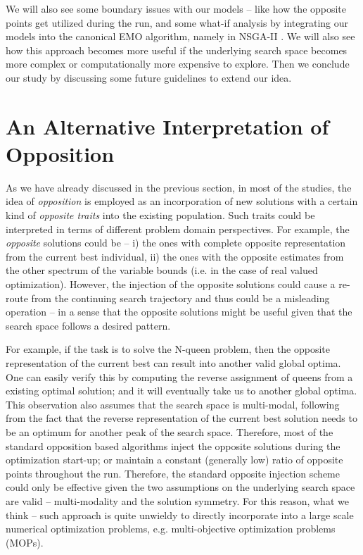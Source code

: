 \documentclass[journal]{IEEEtran}
\begin{document}
We will also see some boundary issues with our models -- like how the opposite points get utilized during the run, and some what-if analysis by integrating our models into the canonical EMO algorithm, namely in NSGA-II \cite{nsga2-main}. We will also see how this approach becomes more useful if the underlying search space becomes more complex or computationally more expensive to explore. Then we conclude our study by discussing some future guidelines to extend our idea.


 

\section{An Alternative Interpretation of Opposition}
\label{sec:alternative-interpretation}
As we have already discussed in the previous section, in most of the studies, the idea of \textit{opposition} is employed as an incorporation of new solutions with a certain kind of \textit{opposite traits} into the existing population. Such traits could be interpreted in terms of different problem domain perspectives. For example, the \textit{opposite} solutions could be -- i) the ones with complete opposite representation from the current best individual, ii) the ones with the opposite estimates from the other spectrum of the variable bounds (i.e. in the case of real valued optimization). However, the injection of the opposite solutions could cause a re-route from the continuing search trajectory and thus could be a misleading operation -- in a sense that the opposite solutions might be useful given that the search space follows a desired pattern. 

For example, if the task is to solve the N-queen problem, then the opposite representation of the current best can result into another valid global optima. One can easily verify this by computing the reverse assignment of queens from a existing optimal solution; and it will eventually take us to another global optima. This observation also assumes that the search space is multi-modal, following from the fact that the reverse representation of the current best solution needs to be an optimum for another peak of the search space. Therefore, most of the standard opposition based algorithms inject the opposite solutions during the optimization start-up; or maintain a constant (generally low) ratio of opposite points throughout the run. Therefore, the standard opposite injection scheme could only be effective given the two assumptions on the underlying search space are valid -- multi-modality and the solution symmetry. For this reason, what we think -- such approach is quite unwieldy to directly incorporate into a large scale numerical optimization problems, e.g. multi-objective optimization problems (MOPs).
\end{document}
